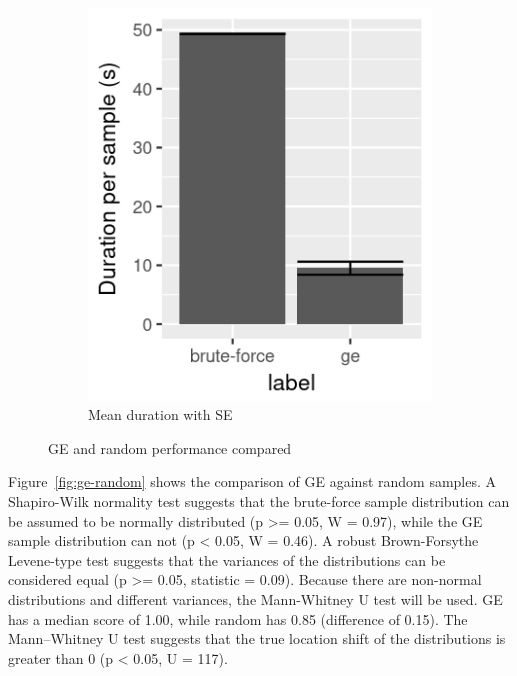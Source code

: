 \begin{figure}
\begin{subfigure}{0.4\textwidth}
        \includegraphics[width=\textwidth]{figures/ge-random-duration}
        \caption{Mean duration with SE}
        \label{fig:ge-random-duration}
    \end{subfigure}
    \caption[GE and random performance compared]{\gls{GE} and random performance compared}
\end{figure}

Figure~\ref{fig:ge-random} shows the comparison of \gls{GE} against random samples.
A Shapiro-Wilk normality test suggests that the brute-force sample distribution can be assumed to be normally distributed (p >= 0.05, W = 0.97), while the \gls{GE} sample distribution can not (p < 0.05, W = 0.46).
A robust Brown-Forsythe Levene-type test suggests that the variances of the distributions can be considered equal (p >= 0.05, statistic = 0.09).
Because there are non-normal distributions and different variances, the Mann-Whitney U test will be used.
\gls{GE} has a median score of 1.00, while random has 0.85 (difference of 0.15).
The Mann–Whitney U test suggests that the true location shift of the distributions is greater than 0 (p < 0.05, U = 117).

